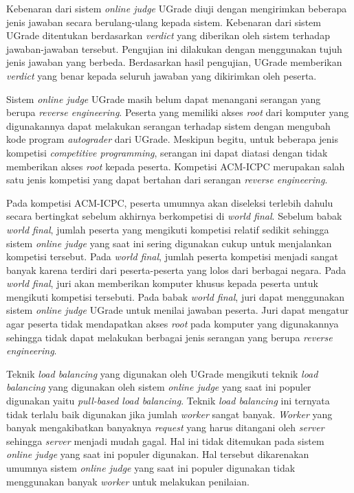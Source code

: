 \par Kebenaran dari sistem \textit{online judge} UGrade diuji dengan mengirimkan beberapa jenis jawaban secara berulang-ulang kepada sistem. Kebenaran dari sistem UGrade ditentukan berdasarkan \textit{verdict} yang diberikan oleh sistem terhadap jawaban-jawaban tersebut. Pengujian ini dilakukan dengan menggunakan tujuh jenis jawaban yang berbeda. Berdasarkan hasil pengujian, UGrade memberikan \textit{verdict} yang benar kepada seluruh jawaban yang dikirimkan oleh peserta.

\par Sistem \textit{online judge} UGrade masih belum dapat menangani serangan yang berupa \textit{reverse engineering}. Peserta yang memiliki akses \textit{root} dari komputer yang digunakannya dapat melakukan serangan terhadap sistem dengan mengubah kode program \textit{autograder} dari UGrade. Meskipun begitu, untuk beberapa jenis kompetisi \textit{competitive programming}, serangan ini dapat diatasi dengan tidak memberikan akses \textit{root} kepada peserta. Kompetisi ACM-ICPC merupakan salah satu jenis kompetisi yang dapat bertahan dari serangan \textit{reverse engineering}.

\par Pada kompetisi ACM-ICPC, peserta umumnya akan diseleksi terlebih dahulu secara bertingkat sebelum akhirnya berkompetisi di \textit{world final}. Sebelum babak \textit{world final}, jumlah peserta yang mengikuti kompetisi relatif sedikit sehingga sistem \textit{online judge} yang saat ini sering digunakan cukup untuk menjalankan kompetisi tersebut. Pada \textit{world final}, jumlah peserta kompetisi menjadi sangat banyak karena terdiri dari peserta-peserta yang lolos dari berbagai negara. Pada \textit{world final}, juri akan memberikan komputer khusus kepada peserta untuk mengikuti kompetisi tersebuti. Pada babak \textit{world final}, juri dapat menggunakan sistem \textit{online judge} UGrade untuk menilai jawaban peserta. Juri dapat mengatur agar peserta tidak mendapatkan akses \textit{root} pada komputer yang digunakannya sehingga tidak dapat melakukan berbagai jenis serangan yang berupa \textit{reverse engineering}.

\par Teknik \textit{load balancing} yang digunakan oleh UGrade mengikuti teknik \textit{load balancing} yang digunakan oleh sistem \textit{online judge} yang saat ini populer digunakan yaitu \textit{pull-based load balancing}. Teknik \textit{load balancing} ini ternyata tidak terlalu baik digunakan jika jumlah \textit{worker} sangat banyak. \textit{Worker} yang banyak mengakibatkan banyaknya \textit{request} yang harus ditangani oleh \textit{server} sehingga \textit{server} menjadi mudah gagal. Hal ini tidak ditemukan pada sistem \textit{online judge} yang saat ini populer digunakan. Hal tersebut dikarenakan umumnya sistem \textit{online judge} yang saat ini populer digunakan tidak menggunakan banyak \textit{worker} untuk melakukan penilaian.

